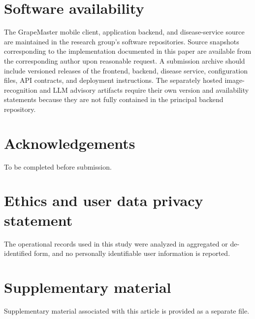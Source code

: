 \documentclass[12pt]{article}
\begin{document}
\section*{Software availability}

The GrapeMaster mobile client, application backend, and disease-service source are maintained in the research group's software repositories. Source snapshots corresponding to the implementation documented in this paper are available from the corresponding author upon reasonable request. A submission archive should include versioned releases of the frontend, backend, disease service, configuration files, API contracts, and deployment instructions. The separately hosted image-recognition and LLM advisory artifacts require their own version and availability statements because they are not fully contained in the principal backend repository.

\section*{Acknowledgements}

To be completed before submission.

\section*{Ethics and user data privacy statement}

The operational records used in this study were analyzed in aggregated or de-identified form, and no personally identifiable user information is reported.

\section*{Supplementary material}

Supplementary material associated with this article is provided as a separate file.



\end{document}
